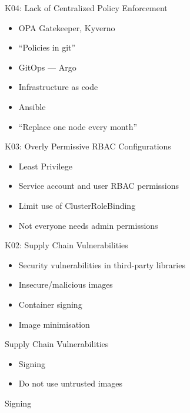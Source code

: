 \documentclass{dcpresentation}
\begin{document}
\begin{frame}{K04: Lack of Centralized Policy Enforcement}
 \begin{itemize}
  \item OPA Gatekeeper, Kyverno
  \item ``Policies in git''
 \end{itemize}
\end{frame}

\begin{frame}
 \begin{itemize}
  \item GitOps --- Argo
  \item Infrastructure as code
  \item Ansible
  \item ``Replace one node every month''
 \end{itemize}
\end{frame}


\begin{frame}{K03: Overly Permissive RBAC Configurations}
 \begin{itemize}
  \item Least Privilege
  \item Service account and user RBAC permissions
  \item Limit use of ClusterRoleBinding
  \item Not everyone needs admin permissions
 \end{itemize}
\end{frame}

\begin{frame}{K02: Supply Chain Vulnerabilities}
 \begin{itemize}
  \item Security vulnerabilities in third-party libraries
  \item Insecure/malicious images
  \item Container signing
  \item Image minimisation
 \end{itemize}
\end{frame}

\begin{frame}{Supply Chain Vulnerabilities}
 \begin{itemize}
  \item Signing
  \item Do not use untrusted images
 \end{itemize}
Signing

\end{frame}
\end{document}
